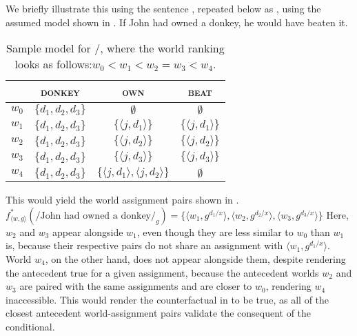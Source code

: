 We briefly illustrate this using the sentence , repeated below as , using the assumed model shown in  \parencite[due][]{Walker2015}.
\ex{}
If John had owned a donkey, he would have beaten it.
\xe
\begin{table}[!htb]
\caption{Sample model for /, where the world ranking looks as follows:\linebreak $w_0<w_1<w_2=w_3<w_4$.}
    \begin{tabular}{lccc}\toprule
            & {\scshape donkey} & {\scshape own} & {\scshape beat}\\\midrule
            $w_0$ & $\{d_1,d_2,d_3\}$ & $\emptyset$ & $\emptyset$\\
            $w_1$ & $\{d_1,d_2,d_3\}$ & $\{\langle j,d_1\rangle\}$ & $\{\langle j,d_1\rangle\}$\\
            $w_2$ & $\{d_1,d_2,d_3\}$ & $\{\langle j,d_2\rangle\}$ & $\{\langle j,d_2\rangle\}$\\
            $w_3$ & $\{d_1,d_2,d_3\}$ & $\{\langle j,d_3\rangle\}$ & $\{\langle j,d_3\rangle\}$\\
            $w_4$ & $\{d_1,d_2,d_3\}$ & $\{\langle j,d_1\rangle,\langle j,d_2\rangle\}$ & $\emptyset$\\
          \bottomrule
    \end{tabular}
\end{table}
This would yield the world assignment pairs shown in .
\ex{}
$f^*_{\langle w,g\rangle}(/\text{John had owned a donkey}/_g)=\{\langle w_1,g^{d_1/x}\rangle,\langle w_2,g^{d_2/x}\rangle,\langle w_3,g^{d_3/x}\rangle\}$
\xe
Here, $w_2$ and $w_3$ appear alongside $w_1$, even though they are less similar to $w_0$ than $w_1$ is, because their respective pairs do not share an assignment with $\langle w_1,g^{d_1/x}\rangle$. World $w_4$, on the other hand, does not appear alongside them, despite rendering the antecedent true for a given assignment, because the antecedent worlds $w_2$ and $w_3$ are paired with the same assignments and are closer to $w_0$, rendering $w_4$ inaccessible. This would render the counterfactual in  to be true, as all of the closest antecedent world-assignment pairs validate the consequent of the conditional.

